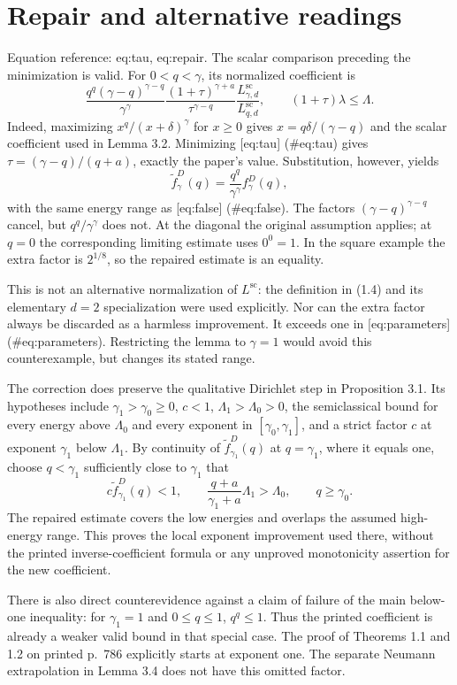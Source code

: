 \documentclass[10pt]{article}
\begin{document}
\section*{Repair and alternative readings}
Equation reference: eq:tau, eq:repair. The scalar comparison preceding the minimization is valid. For \(0<q<\gamma\), its normalized coefficient is \[
 \frac{q^q(\gamma-q)^{\gamma-q}}{\gamma^\gamma}
 \frac{(1+\tau)^{\gamma+a}}{\tau^{\gamma-q}}
 \frac{L^{\mathrm{sc}}_{\gamma,d}}{L^{\mathrm{sc}}_{q,d}},
 \qquad (1+\tau)\lambda\leq\Lambda.\] Indeed, maximizing \(x^q/(x+\delta)^\gamma\) for \(x\geq0\) gives \(x=q\delta/(\gamma-q)\) and the scalar coefficient used in Lemma 3.2. Minimizing [eq:tau] (\#eq:tau) gives \(\tau=(\gamma-q)/(q+a)\), exactly the paper’s value. Substitution, however, yields \[
 \widetilde f_\gamma^D(q)
 =\frac{q^q}{\gamma^\gamma}f_\gamma^D(q),\] with the same energy range as [eq:false] (\#eq:false). The factors \((\gamma-q)^{\gamma-q}\) cancel, but \(q^q/\gamma^\gamma\) does not. At the diagonal the original assumption applies; at \(q=0\) the corresponding limiting estimate uses \(0^0=1\). In the square example the extra factor is \(2^{1/8}\), so the repaired estimate is an equality.\par
This is not an alternative normalization of \(L^{\mathrm{sc}}\): the definition in (1.4) and its elementary \(d=2\) specialization were used explicitly. Nor can the extra factor always be discarded as a harmless improvement. It exceeds one in [eq:parameters] (\#eq:parameters). Restricting the lemma to \(\gamma=1\) would avoid this counterexample, but changes its stated range.\par
The correction does preserve the qualitative Dirichlet step in Proposition 3.1. Its hypotheses include \(\gamma_1>\gamma_0\geq0\), \(c<1\), \(\Lambda_1>\Lambda_0>0\), the semiclassical bound for every energy above \(\Lambda_0\) and every exponent in \([\gamma_0,\gamma_1]\), and a strict factor \(c\) at exponent \(\gamma_1\) below \(\Lambda_1\). By continuity of \(\widetilde f_{\gamma_1}^D(q)\) at \(q=\gamma_1\), where it equals one, choose \(q<\gamma_1\) sufficiently close to \(\gamma_1\) that \[c\widetilde f_{\gamma_1}^D(q)<1,\qquad
 \frac{q+a}{\gamma_1+a}\Lambda_1>\Lambda_0,\qquad q\geq\gamma_0.\] The repaired estimate covers the low energies and overlaps the assumed high-energy range. This proves the local exponent improvement used there, without the printed inverse-coefficient formula or any unproved monotonicity assertion for the new coefficient.\par
There is also direct counterevidence against a claim of failure of the main below-one inequality: for \(\gamma_1=1\) and \(0\leq q\leq1\), \(q^q\leq1\). Thus the printed coefficient is already a weaker valid bound in that special case. The proof of Theorems 1.1 and 1.2 on printed p. 786 explicitly starts at exponent one. The separate Neumann extrapolation in Lemma 3.4 does not have this omitted factor.\par
\end{document}
